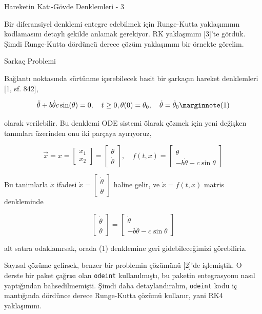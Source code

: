 \documentclass[12pt,fleqn]{article}\usepackage{../../common}
\begin{document}
Hareketin Katı-Gövde Denklemleri - 3

Bir diferansiyel denklemi entegre edebilmek için Runge-Kutta yaklaşımının
kodlamasını detaylı şekilde anlamak gerekiyor. RK yaklaşımını [3]'te gördük.
Şimdi Runge-Kutta dördüncü derece çözüm yaklaşımını bir örnekte görelim.

Sarkaç Problemi

Bağlantı noktasında sürtünme içerebilecek basit bir şarkaçın hareket denklemleri
[1, sf. 842],

$$
\ddot{\theta} + b\dot{\theta}  c\sin(\theta) = 0, \quad
t \ge 0, \theta(0)=\theta_0, \quad
\dot{\theta} = \dot{\theta}_0
\mlabel{1}
$$

olarak verilebilir. Bu denklemi ODE sistemi ölarak çözmek için yeni değişken
tanımları üzerinden onu iki parçaya ayırıyoruz,

$$
\vec{x} = x = \left[\begin{array}{ccc}
x_1 \\ x_2
\end{array}\right] = 
\left[\begin{array}{c}
\theta \\ \dot{\theta}
\end{array}\right], \quad
f(t,x) = \left[\begin{array}{c}
\dot{\theta} \\ -b \dot{\theta} - c\sin\theta
\end{array}\right]
$$

Bu tanimlarla $\dot{x}$ ifadesi
$
\dot{x} = \left[\begin{array}{c} \dot{\theta} \\ \ddot{\theta} \end{array}\right]
$
haline gelir,  ve $\dot{x} = f(t,x)$ matris denkleminde 

$$
\left[\begin{array}{c} \dot{\theta} \\ \ddot{\theta} \end{array}\right]=
\left[\begin{array}{c} \dot{\theta} \\ -b \dot{\theta} - c\sin\theta \end{array}\right]
$$

alt satıra odaklanırsak, orada (1) denklemine geri gidebileceğimizi görebiliriz.

Sayısal çözüme gelirsek, benzer bir problemin çözümünü [2]'de işlemiştik.  O
derste bir paket çağrısı olan \verb!odeint! kullanılmıştı, bu paketin
entegrasyonu nasıl yaptığından bahsedilmemişti. Şimdi daha detaylandıralım,
\verb!odeint! kodu iç mantığında dördünce derece Runge-Kutta çözümü kullanır,
yani RK4 yaklaşımını.
\end{document}
